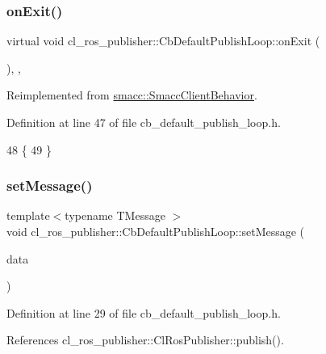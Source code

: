 \subsubsection{\texorpdfstring{on\+Exit()}{onExit()}}
{\footnotesize\ttfamily virtual void cl\+\_\+ros\+\_\+publisher\+::\+Cb\+Default\+Publish\+Loop\+::on\+Exit (\begin{DoxyParamCaption}{ }\end{DoxyParamCaption})\hspace{0.3cm}{\ttfamily [inline]}, {\ttfamily [override]}, {\ttfamily [virtual]}}



Reimplemented from \hyperlink{classsmacc_1_1SmaccClientBehavior_ac0cd72d42bd00425362a97c9803ecce5}{smacc\+::\+Smacc\+Client\+Behavior}.



Definition at line 47 of file cb\+\_\+default\+\_\+publish\+\_\+loop.\+h.


\begin{DoxyCode}
48     \{
49     \}
\end{DoxyCode}
\mbox{\label{classcl__ros__publisher_1_1CbDefaultPublishLoop_a0377d84fde4cd1193abe5daf172359a7}} 
\subsubsection{\texorpdfstring{set\+Message()}{setMessage()}}
{\footnotesize\ttfamily template$<$typename T\+Message $>$ \\
void cl\+\_\+ros\+\_\+publisher\+::\+Cb\+Default\+Publish\+Loop\+::set\+Message (\begin{DoxyParamCaption}\item[{const T\+Message \&}]{data }\end{DoxyParamCaption})\hspace{0.3cm}{\ttfamily [inline]}}



Definition at line 29 of file cb\+\_\+default\+\_\+publish\+\_\+loop.\+h.



References cl\+\_\+ros\+\_\+publisher\+::\+Cl\+Ros\+Publisher\+::publish().



